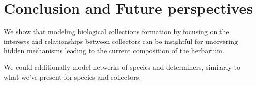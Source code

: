 \chapter{Conclusion and Future perspectives}\label{conclusion_perspectives}





We show that modeling biological collections formation by focusing on the interests and relationships between collectors can be insightful for uncovering hidden mechanisms leading to the current composition of the herbarium. 


We could additionally model networks of species and determiners, similarly to what we've present for species and collectors.



















